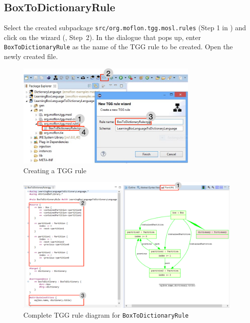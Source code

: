 \newpage
\hypertarget{rules vis}{}
\subsection{BoxToDictionaryRule}
\genHeader

\begin{stepbystep}

\item Select the created subpackage \texttt{src/org.moflon.tgg.mosl.rules} (Step 1 in ) and click on the wizard  (\eMoflonCreateTGGRuleIcon, Step~2).
In the dialogue that pops up, enter \texttt{BoxToDictionaryRule} as the name of the TGG rule to be created.
Open the newly created file.

\begin{figure}[htbp]
\begin{center}
  \includegraphics[width=0.8\textwidth]{../../org.moflon.doc.handbook.04_tripleGraphTransformations/4_rules/visRImages/ea_TGGNewRule.jpg}
  \caption{Creating a TGG rule}
  \label{ea:create_tgg_rule}
\end{center}
\end{figure}

\begin{figure}[htbp]
\begin{center}
  \includegraphics[angle=90,width=\textwidth]{../../org.moflon.doc.handbook.04_tripleGraphTransformations/4_rules/visRImages/ea_BoxToDictionaryRuleComplete.pdf}
  \caption{Complete TGG rule diagram for \texttt{BoxToDictionaryRule}}
  \label{ea:boxtodictionaryrule_complete}
  \end{center}
\end{figure}


\end{stepbystep}
